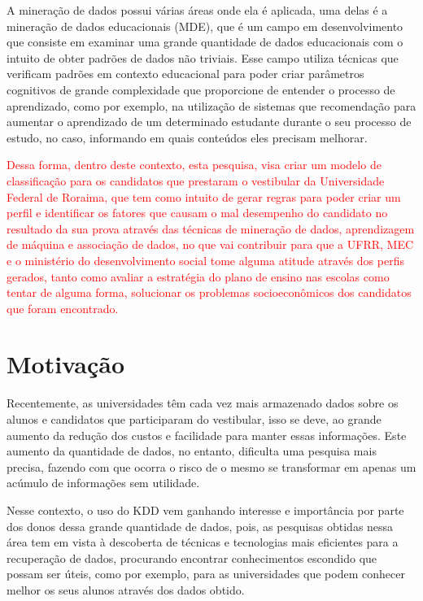 \par
A mineração de dados possui várias áreas onde ela é aplicada, uma delas é a mineração de dados educacionais (MDE), que é um campo em desenvolvimento que consiste em examinar uma grande quantidade de dados educacionais com o intuito de obter padrões de dados não triviais. Esse campo utiliza técnicas que verificam padrões em contexto educacional para poder criar parâmetros cognitivos de grande complexidade que proporcione de entender o processo de aprendizado, como por exemplo, na utilização de sistemas que recomendação para aumentar o aprendizado de um determinado estudante durante o seu processo de estudo, no caso, informando em quais conteúdos eles precisam melhorar.

\par
\textcolor{red}{Dessa forma, dentro deste contexto, esta pesquisa, visa criar um modelo de classificação para os candidatos que prestaram o vestibular da Universidade Federal de Roraima,  que tem como intuito de gerar regras para poder criar um perfil e identificar os fatores que causam o mal desempenho do candidato no resultado da sua prova através das técnicas de mineração de dados, aprendizagem de máquina e associação de dados, no que vai contribuir para que a UFRR, MEC e o ministério do desenvolvimento social tome alguma atitude através dos perfis gerados, tanto como avaliar a estratégia do plano de ensino nas escolas como tentar de alguma forma, solucionar os problemas socioeconômicos dos candidatos que foram encontrado.}







\section{Motivação}

Recentemente, as universidades têm cada vez mais armazenado dados sobre os alunos e candidatos que participaram do vestibular, isso se deve, ao  grande aumento da redução dos custos e facilidade para manter essas informações. Este aumento da quantidade de dados, no entanto, dificulta uma pesquisa mais precisa, fazendo com que ocorra o risco de o mesmo se transformar em apenas um acúmulo de informações sem utilidade. 

\par
Nesse contexto, o uso do KDD vem ganhando interesse e importância por parte dos donos dessa grande quantidade de dados, pois, as pesquisas obtidas nessa área tem em vista à descoberta de técnicas e tecnologias mais eficientes para a recuperação de dados, procurando encontrar conhecimentos escondido que possam ser úteis, como por exemplo, para as universidades que podem conhecer melhor os seus alunos através dos dados obtido.

